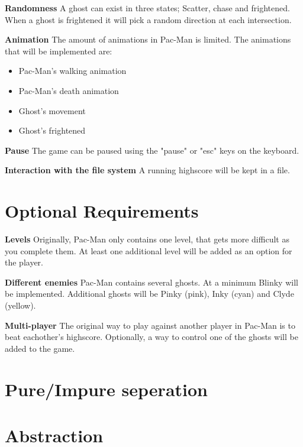\documentclass[11pt]{Article}
\begin{document}
\textbf{Randomness} A ghost can exist in three states; Scatter, chase and frightened. When a ghost is frightened it will pick a random direction at each intersection.

\textbf{Animation} The amount of animations in Pac-Man is limited. The animations that will be implemented are:
\begin{itemize}
  \item Pac-Man's walking animation
  \item Pac-Man's death animation
  \item Ghost's movement
  \item Ghost's frightened
\end{itemize}

\textbf{Pause} The game can be paused using the "pause" or "esc" keys on the keyboard.

\textbf{Interaction with the file system} A running highscore will be kept in a file.

\section{Optional Requirements} \label{ch:optionalRequirements}

\textbf{Levels} Originally, Pac-Man only contains one level, that gets more difficult as you complete them. At least one additional level will be added as an option for the player.

\textbf{Different enemies} Pac-Man contains several ghosts. At a minimum Blinky will be implemented. Additional ghosts will be Pinky (pink), Inky (cyan) and Clyde (yellow).

\textbf{Multi-player} The original way to play against another player in Pac-Man is to beat eachother's highscore. Optionally, a way to control one of the ghosts will be added to the game.


\section{Pure/Impure seperation} \label{ch:pureSeperation}
\section{Abstraction} \label{ch:abstraction}








\end{document}
